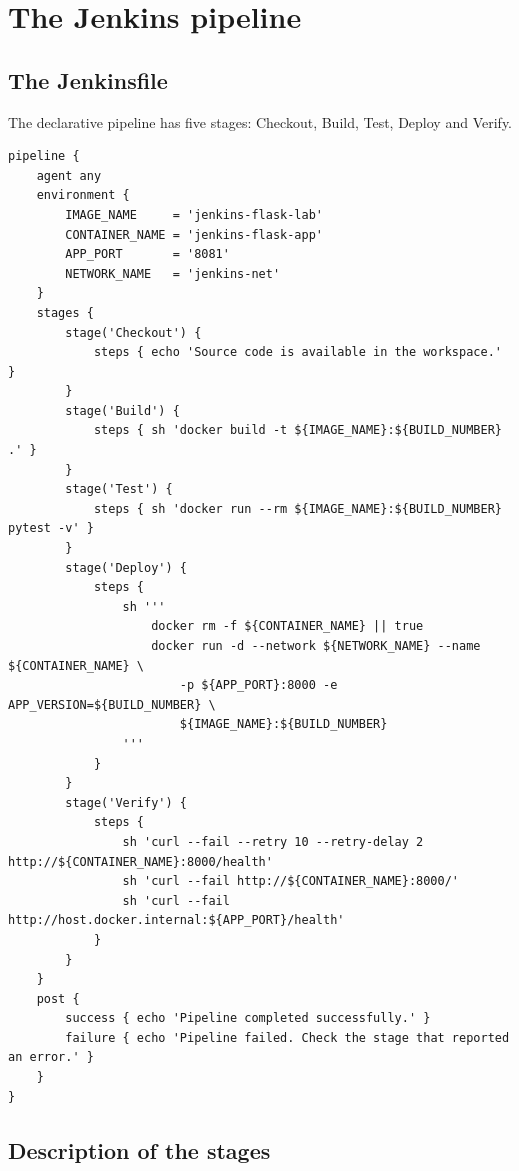 \documentclass[11pt,a4paper]{article}
\begin{document}
\section{The Jenkins pipeline}

\subsection{The Jenkinsfile}

The declarative pipeline has five stages: Checkout, Build, Test, Deploy and Verify.

\begin{lstlisting}[caption={Jenkinsfile (Linux version used by Jenkins).}]
pipeline {
    agent any
    environment {
        IMAGE_NAME     = 'jenkins-flask-lab'
        CONTAINER_NAME = 'jenkins-flask-app'
        APP_PORT       = '8081'
        NETWORK_NAME   = 'jenkins-net'
    }
    stages {
        stage('Checkout') {
            steps { echo 'Source code is available in the workspace.' }
        }
        stage('Build') {
            steps { sh 'docker build -t ${IMAGE_NAME}:${BUILD_NUMBER} .' }
        }
        stage('Test') {
            steps { sh 'docker run --rm ${IMAGE_NAME}:${BUILD_NUMBER} pytest -v' }
        }
        stage('Deploy') {
            steps {
                sh '''
                    docker rm -f ${CONTAINER_NAME} || true
                    docker run -d --network ${NETWORK_NAME} --name ${CONTAINER_NAME} \
                        -p ${APP_PORT}:8000 -e APP_VERSION=${BUILD_NUMBER} \
                        ${IMAGE_NAME}:${BUILD_NUMBER}
                '''
            }
        }
        stage('Verify') {
            steps {
                sh 'curl --fail --retry 10 --retry-delay 2 http://${CONTAINER_NAME}:8000/health'
                sh 'curl --fail http://${CONTAINER_NAME}:8000/'
                sh 'curl --fail http://host.docker.internal:${APP_PORT}/health'
            }
        }
    }
    post {
        success { echo 'Pipeline completed successfully.' }
        failure { echo 'Pipeline failed. Check the stage that reported an error.' }
    }
}
\end{lstlisting}

\subsection{Description of the stages}
\end{document}
